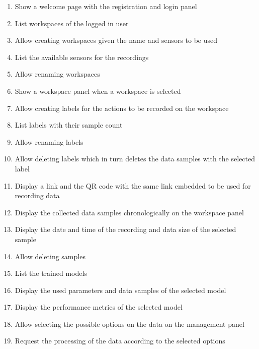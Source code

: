\begin{enumerate}[{label = \textbf{/F{\protect\twodigits{\arabic{enumi}}}0/}, leftmargin = *}]
    \item \label{/F010/} Show a welcome page with the registration and login panel
    \item List workspaces of the logged in user
    \item Allow creating workspaces given the name and sensors to be used
    \item List the available sensors for the recordings
    \item Allow renaming workspaces
    \item Show a workspace panel when a workspace is selected
    \item Allow creating labels for the actions to be recorded on the workspace
    \item List labels with their sample count
    \item Allow renaming labels
    \item Allow deleting labels which in turn deletes the data samples with the selected label
    \item Display a link and the QR code with the same link embedded to be used for recording data
    \item Display the collected data samples chronologically on the workspace panel
    \item Display the date and time of the recording and data size of the selected sample
    \item Allow deleting samples
    \item List the trained models
    \item Display the used parameters and data samples of the selected model
    \item Display the performance metrics of the selected model
    \item Allow selecting the possible options on the data on the management panel %
    \item Request the processing of the data according to the selected options
\end{enumerate}


